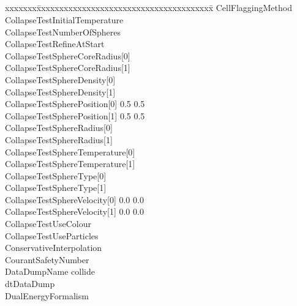 \documentclass{book}
\begin{document}
\subsection{\enzo}

{\parametersize
\begin{tabbing}
xxxxxxx\=xxxxxxxxxxxxxxxxxxxxxxxxxxxxxxxxxxxxxxx\=\kill
\> CellFlaggingMethod             \\
\> CollapseTestInitialTemperature      \\
\> CollapseTestNumberOfSpheres  \\
\> CollapseTestRefineAtStart    \\
\> CollapseTestSphereCoreRadius[0]   \\
\> CollapseTestSphereCoreRadius[1]   \\
\> CollapseTestSphereDensity[0]      \\
\> CollapseTestSphereDensity[1]      \\
\> CollapseTestSpherePosition[0]     0.5 0.5 \\
\> CollapseTestSpherePosition[1]     0.5 0.5 \\
\> CollapseTestSphereRadius[0]       \\
\> CollapseTestSphereRadius[1]       \\
\> CollapseTestSphereTemperature[0]  \\
\> CollapseTestSphereTemperature[1]  \\
\> CollapseTestSphereType[0]                \\
\> CollapseTestSphereType[1]                \\
\> CollapseTestSphereVelocity[0]     0.0 0.0 \\
\> CollapseTestSphereVelocity[1]     0.0 0.0 \\
\> CollapseTestUseColour        \\
\> CollapseTestUseParticles     \\
\> ConservativeInterpolation    \\
\> CourantSafetyNumber          \\
\> DataDumpName           \> collide \\
\> dtDataDump              \\
\> DualEnergyFormalism                 \\

\end{tabbing}}
\end{document}
